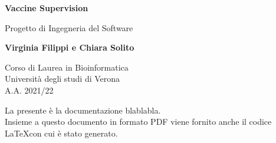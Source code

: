 \documentclass{article}
\begin{document}
\newcommand\tab[1][0.3cm]{\hspace*{#1}}


\begin{titlepage}
    \begin{center}
        \vspace*{1cm}
            
        \Huge
        \textbf{Vaccine Supervision}
            
        \vspace{0.5cm}
        \LARGE
        Progetto di Ingegneria del Software
            
        \vspace{1.5cm}
            
        \textbf{Virginia Filippi e Chiara Solito}

        \vspace{0.8cm}

            
        \Large
        Corso di Laurea in Bioinformatica\\
        Università degli studi di Verona\\
        A.A. 2021/22
            
    \end{center}
\end{titlepage}
La presente è la documentazione blablabla.\\
Insieme a questo documento in formato PDF viene fornito anche il codice \LaTeX  con cui è stato generato.
\tableofcontents
\thispagestyle{empty}
\newpage
\thispagestyle{empty}
\end{document}
